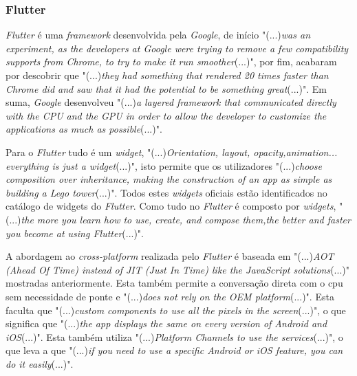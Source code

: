 \subsubsection{Flutter}\label{flutter_explaining}
\textit{Flutter} é uma \textit{framework} desenvolvida pela \textit{Google}, de início "(...)\emph{was an experiment, as the developers at Google were trying to remove a few compatibility supports from Chrome, to try to make it run smoother}(...)"\citep{flutter}, por fim, acabaram por descobrir que "(...)\emph{they had something that rendered 20 times faster than Chrome did and saw that it had the potential to be something great}(...)"\citep{flutter}. Em suma, \textit{Google} desenvolveu "(...)\emph{a layered framework that communicated directly with the CPU and the GPU in order to allow the developer to customize the applications as much as possible}(...)"\citep{flutter}.

Para o \textit{Flutter} tudo é um \textit{widget}, "(...)\emph{Orientation, layout, opacity,animation... everything is just a widget}(...)"\citep{flutter}, isto permite que os utilizadores "(...)\emph{choose composition over inheritance, making the construction of an app as simple as building a Lego tower}(...)"\citep{flutter}. Todos estes \textit{widgets} oficiais estão identificados no catálogo de widgets do \textit{Flutter}. Como tudo no \textit{Flutter} é composto por \textit{widgets}, "(...)\emph{the more you learn how to use, create, and compose them,the better and faster you become at using Flutter}(...)"\citep{flutter}.

A abordagem ao \textit{cross-platform} realizada pelo \textit{Flutter} é baseada em "(...)\emph{AOT (Ahead Of Time) instead of JIT (Just In Time) like the JavaScript solutions}(...)"\citep{flutter} mostradas anteriormente. Esta também permite a conversação direta com o cpu sem necessidade de ponte e "(...)\emph{does not rely on the OEM platform}(...)"\citep{flutter}. Esta faculta que "(...)\emph{custom components to use all the pixels in the screen}(...)"\citep{flutter}, o que significa que "(...)\emph{the app displays the same on every version of Android and iOS}(...)"\citep{flutter}. Esta também utiliza "(...)\emph{Platform Channels to use the services}(...)"\citep{flutter}, o que leva a que "(...)\emph{if you need to use a specific Android or iOS feature, you can do it easily}(...)"\citep{flutter}.